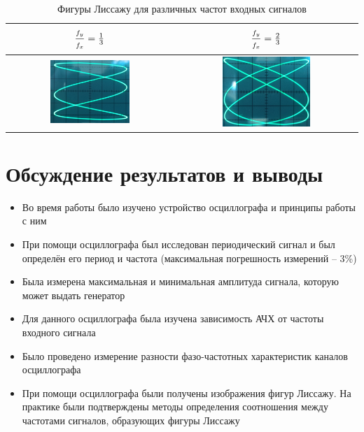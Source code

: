 \documentclass[a4paper,12pt]{article} %
\begin{document}
\begin{table}[H]
	\centering
	\begin{tabular}{|c|c|}
		\hline
	{\Large $ \frac{f_y\strut }{f_x\strut } = \frac{1}{3}$}	& {\Large $ \frac{f_y\strut }{f_x\strut } = \frac{2}{3}$} \\ \hline
	\includegraphics[width=0.5\textwidth]{liss_1_3.jpg}	& \includegraphics[width=0.5\textwidth]{liss_2_3.jpg} \\ \hline
	\end{tabular}
	\caption{Фигуры Лиссажу для различных частот входных сигналов}
	\label{tab:lissazhu}
\end{table}

\section{Обсуждение результатов и выводы}

\begin{itemize}
	\item Во время работы было изучено устройство осциллографа и принципы работы с ним
	\item При помощи осциллографа был исследован периодический сигнал и был определён его период и частота (максимальная погрешность измерений -- 3\%)
	\item Была измерена максимальная и минимальная амплитуда сигнала, которую может выдать генератор
	\item Для данного осциллографа была изучена зависимость АЧХ от частоты входного сигнала
	\item Было проведено измерение разности фазо-частотных характеристик каналов осциллографа
	\item При помощи осциллографа были получены изображения фигур Лиссажу. На практике были подтверждены методы определения соотношения между частотами сигналов, образующих фигуры Лиссажу
\end{itemize}
\end{document}

